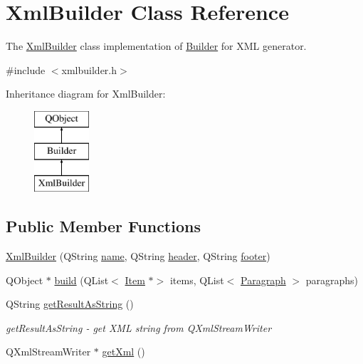 \hypertarget{class_xml_builder}{}\section{Xml\+Builder Class Reference}
\label{class_xml_builder}


The \hyperlink{class_xml_builder}{Xml\+Builder} class implementation of \hyperlink{class_builder}{Builder} for X\+ML generator.  




{\ttfamily \#include $<$xmlbuilder.\+h$>$}

Inheritance diagram for Xml\+Builder\+:\begin{figure}[H]
\begin{center}
\leavevmode
\includegraphics[height=3.000000cm]{class_xml_builder}
\end{center}
\end{figure}
\subsection*{Public Member Functions}
\begin{DoxyCompactItemize}
\item 
\hyperlink{class_xml_builder_affc2a88fc3eaefab78f1142cc2756aad}{Xml\+Builder} (Q\+String \hyperlink{class_builder_ad8ac906f8ce85ebcd061c4ee8e6f6a01}{name}, Q\+String \hyperlink{class_builder_ae3800e384b079c2d66ab4d8f98cbb4ad}{header}, Q\+String \hyperlink{class_builder_a5ace791b99eb11341d6f39e35fdd2ce7}{footer})
\item 
Q\+Object $\ast$ \hyperlink{class_xml_builder_a29a46891d09f490c19c1063884b66f33}{build} (Q\+List$<$ \hyperlink{class_item}{Item} $\ast$$>$ items, Q\+List$<$ \hyperlink{class_paragraph}{Paragraph} $>$ paragraphs)
\item 
Q\+String \hyperlink{class_xml_builder_af445b2645cb7bc6e15ccca26fca26c83}{get\+Result\+As\+String} ()
\begin{DoxyCompactList}\small\item\em get\+Result\+As\+String -\/ get X\+ML string from Q\+Xml\+Stream\+Writer \end{DoxyCompactList}\item 
Q\+Xml\+Stream\+Writer $\ast$ \hyperlink{class_xml_builder_ac30c219c08203e1a18e38e7e43c3252e}{get\+Xml} ()
\end{DoxyCompactItemize}
